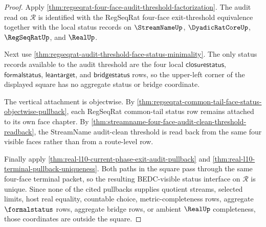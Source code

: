 \begin{proof}
Apply \autoref{thm:regseqrat-four-face-audit-threshold-factorization}. The audit read on $\mathcal R$ is identified with the RegSeqRat four-face exit-threshold equivalence together with the local status records on $\StreamNameUp$, $\DyadicRatCoreUp$, $\RegSeqRatUp$, and $\RealUp$.

Next use \autoref{thm:regseqrat-audit-threshold-face-status-minimality}. The only status records available to the audit threshold are the four local $\mathsf{closurestatus}$, $\mathsf{formalstatus}$, $\mathsf{leantarget}$, and $\mathsf{bridgestatus}$ rows, so the upper-left corner of the displayed square has no aggregate status or bridge coordinate.

The vertical attachment is objectwise. By \autoref{thm:regseqrat-common-tail-face-status-objectwise-pullback}, each RegSeqRat common-tail status row remains attached to its own face chapter. By \autoref{thm:streamname-four-face-audit-clean-threshold-readback}, the StreamName audit-clean threshold is read back from the same four visible faces rather than from a route-level row.

Finally apply \autoref{thm:real-l10-current-phase-exit-audit-pullback} and \autoref{thm:real-l10-terminal-pullback-uniqueness}. Both paths in the square pass through the same four-face terminal packet, so the resulting BEDC-visible status interface on $\mathcal R$ is unique. Since none of the cited pullbacks supplies quotient streams, selected limits, host real equality, countable choice, metric-completeness rows, aggregate $\formalstatus$ rows, aggregate bridge rows, or ambient $\RealUp$ completeness, those coordinates are outside the square.
\end{proof}

